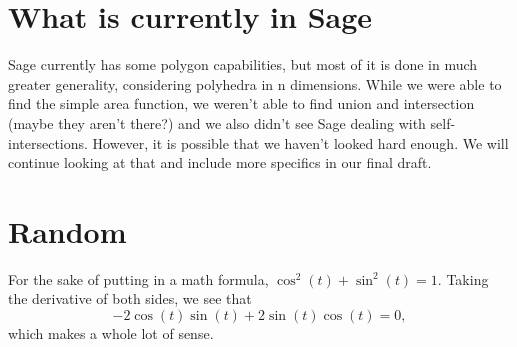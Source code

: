 \documentclass[psamsfonts]{amsart}
\theoremstyle{definition}
\theoremstyle{remark}
\numberwithin{equation}{section}
\begin{document}
\section{What is currently in Sage}
Sage currently has some polygon capabilities, but most of it is done in much greater generality, considering polyhedra in n dimensions. While we were able to find the simple area function, we weren't able to find union and intersection (maybe they aren't there?) and we also didn't see Sage dealing with self-intersections.
However, it is possible that we haven't looked hard enough. We will continue looking at that and include more specifics in our final draft. 

\section{Random}
For the sake of putting in a math formula, $\cos^2(t)+\sin^2(t)=1.$
Taking the derivative of both sides, we see that
$$-2\cos(t)\sin(t)+2\sin(t)\cos(t)=0,$$ which makes a whole lot of sense.
\end{document}
